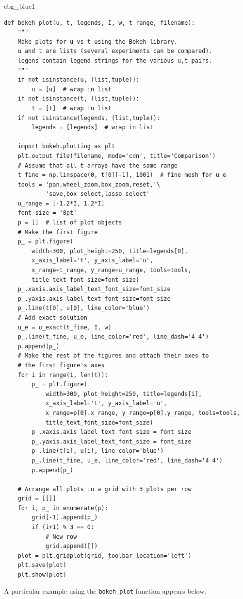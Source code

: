 \documentclass[%
oneside,                 %
final,                   %
10pt]{article}
\newenvironment{_cod_tight}[1]{
   \def\FrameCommand{\colorbox{#1}}
   \FrameRule0.6pt\MakeFramed {\FrameRestore}\vskip3mm}
   {\vskip0mm\endMakeFramed}
\newenvironment{cod}[1]{
\bgroup\rmfamily
\fboxsep=0mm\relax
\begin{_cod_tight}{#1}
\list{}{\parsep=-2mm\parskip=0mm\topsep=0pt\leftmargin=2mm
\rightmargin=2\leftmargin\leftmargin=4pt\relax}
\item\relax}
{\endlist\end{_cod_tight}\egroup}
\begin{document}
\begin{cod}{cbg_blue1}\begin{Verbatim}[numbers=none,fontsize=\fontsize{9pt}{9pt},baselinestretch=0.95,xleftmargin=2mm]
def bokeh_plot(u, t, legends, I, w, t_range, filename):
    """
    Make plots for u vs t using the Bokeh library.
    u and t are lists (several experiments can be compared).
    legens contain legend strings for the various u,t pairs.
    """
    if not isinstance(u, (list,tuple)):
        u = [u]  # wrap in list
    if not isinstance(t, (list,tuple)):
        t = [t]  # wrap in list
    if not isinstance(legends, (list,tuple)):
        legends = [legends]  # wrap in list

    import bokeh.plotting as plt
    plt.output_file(filename, mode='cdn', title='Comparison')
    # Assume that all t arrays have the same range
    t_fine = np.linspace(0, t[0][-1], 1001)  # fine mesh for u_e
    tools = 'pan,wheel_zoom,box_zoom,reset,'\ 
            'save,box_select,lasso_select'
    u_range = [-1.2*I, 1.2*I]
    font_size = '8pt'
    p = []  # list of plot objects
    # Make the first figure
    p_ = plt.figure(
        width=300, plot_height=250, title=legends[0],
        x_axis_label='t', y_axis_label='u',
        x_range=t_range, y_range=u_range, tools=tools,
        title_text_font_size=font_size)
    p_.xaxis.axis_label_text_font_size=font_size
    p_.yaxis.axis_label_text_font_size=font_size
    p_.line(t[0], u[0], line_color='blue')
    # Add exact solution
    u_e = u_exact(t_fine, I, w)
    p_.line(t_fine, u_e, line_color='red', line_dash='4 4')
    p.append(p_)
    # Make the rest of the figures and attach their axes to
    # the first figure's axes
    for i in range(1, len(t)):
        p_ = plt.figure(
            width=300, plot_height=250, title=legends[i],
            x_axis_label='t', y_axis_label='u',
            x_range=p[0].x_range, y_range=p[0].y_range, tools=tools,
            title_text_font_size=font_size)
        p_.xaxis.axis_label_text_font_size = font_size
        p_.yaxis.axis_label_text_font_size = font_size
        p_.line(t[i], u[i], line_color='blue')
        p_.line(t_fine, u_e, line_color='red', line_dash='4 4')
        p.append(p_)

    # Arrange all plots in a grid with 3 plots per row
    grid = [[]]
    for i, p_ in enumerate(p):
        grid[-1].append(p_)
        if (i+1) % 3 == 0:
            # New row
            grid.append([])
    plot = plt.gridplot(grid, toolbar_location='left')
    plt.save(plot)
    plt.show(plot)
\end{Verbatim}
\end{cod}
\noindent
A particular example using the \Verb!bokeh_plot! function appears below.
\end{document}
